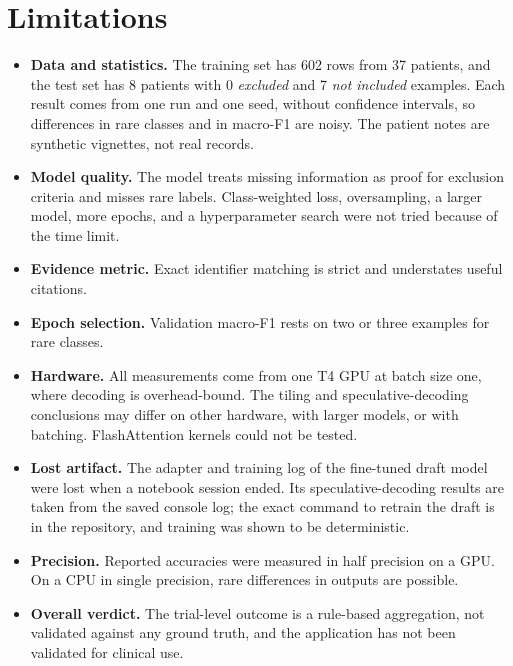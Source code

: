 \documentclass[conference]{IEEEtran}
\begin{document}
\section{Limitations}\label{sec:limits}
\begin{itemize}
\item \textbf{Data and statistics.} The training set has 602 rows from 37 patients, and the test set has 8 patients with 0 \emph{excluded} and 7 \emph{not included} examples. Each result comes from one run and one seed, without confidence intervals, so differences in rare classes and in macro-F1 are noisy. The patient notes are synthetic vignettes, not real records.
\item \textbf{Model quality.} The model treats missing information as proof for exclusion criteria and misses rare labels. Class-weighted loss, oversampling, a larger model, more epochs, and a hyperparameter search were not tried because of the time limit.
\item \textbf{Evidence metric.} Exact identifier matching is strict and understates useful citations.
\item \textbf{Epoch selection.} Validation macro-F1 rests on two or three examples for rare classes.
\item \textbf{Hardware.} All measurements come from one T4 GPU at batch size one, where decoding is overhead-bound. The tiling and speculative-decoding conclusions may differ on other hardware, with larger models, or with batching. FlashAttention kernels could not be tested.
\item \textbf{Lost artifact.} The adapter and training log of the fine-tuned draft model were lost when a notebook session ended. Its speculative-decoding results are taken from the saved console log; the exact command to retrain the draft is in the repository, and training was shown to be deterministic.
\item \textbf{Precision.} Reported accuracies were measured in half precision on a GPU. On a CPU in single precision, rare differences in outputs are possible.
\item \textbf{Overall verdict.} The trial-level outcome is a rule-based aggregation, not validated against any ground truth, and the application has not been validated for clinical use.
\end{itemize}

\end{document}
